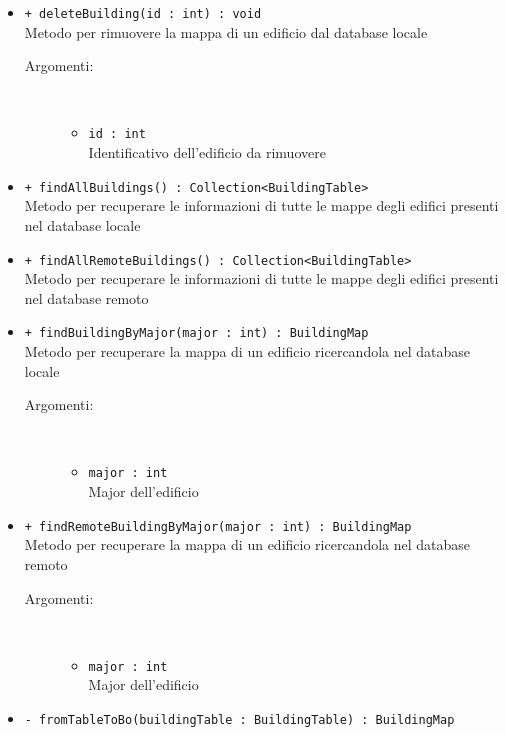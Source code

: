 \documentclass[../DefinizioneDiProdotto.tex]{subfiles}
\begin{document}
\begin{description}
\begin{itemize}
\begin{description}
\end{description}
\item \texttt{+ deleteBuilding(id : int) : void}\\
Metodo per rimuovere la mappa di un edificio dal database locale
 \begin{description}
\item[Argomenti:] \
\begin{itemize}
\item \texttt{id : int}\\
Identificativo dell'edificio da rimuovere\end{itemize}
\end{description}
\item \texttt{+ findAllBuildings() : Collection<BuildingTable>}\\
Metodo per recuperare le informazioni di tutte le mappe degli edifici presenti nel database locale
 \item \texttt{+ findAllRemoteBuildings() : Collection<BuildingTable>}\\
Metodo per recuperare le informazioni di tutte le mappe degli edifici presenti nel database remoto
 \item \texttt{+ findBuildingByMajor(major : int) : BuildingMap}\\
Metodo per recuperare la mappa di un edificio ricercandola nel database locale
 \begin{description}
\item[Argomenti:] \
\begin{itemize}
\item \texttt{major : int}\\
Major dell'edificio\end{itemize}
\end{description}
\item \texttt{+ findRemoteBuildingByMajor(major : int) : BuildingMap}\\
Metodo per recuperare la mappa di un edificio ricercandola nel database remoto
 \begin{description}
\item[Argomenti:] \
\begin{itemize}
\item \texttt{major : int}\\
Major dell'edificio\end{itemize}
\end{description}
\item \texttt{- fromTableToBo(buildingTable : BuildingTable) : BuildingMap}\\

\end{itemize}
\end{description}
\end{document}
